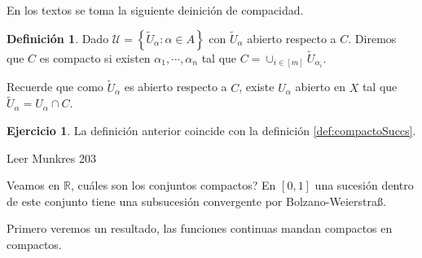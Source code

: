 \documentclass[12pt]{article}
\theoremstyle{plain}
\theoremstyle{definition}
\newtheorem{Def}[Th]{Definición}       %
\newtheorem{Ej}[Th]{Ejercicio}
\theoremstyle{remark}
\numberwithin{equation}{section}
\newcommand{\bR}{\mathbb{R}}        %
\newcommand{\cU}{\mathcal{U}}       %
\renewcommand{\:}{\colon}           %
\newcommand{\conj}[1]{\left\lbrace#1\right\rbrace}
\newcommand{\bonj}[1]{\left\lbrack#1\right\rbrack}
\begin{document}
\begin{multicols}{2}
En los textos se toma la siguiente deinición de compacidad.
\begin{Def}\label{def:compactoCubrimientos}
  Dado $\cU=\conj{\widetilde{U}_\alpha\colon \alpha\in A}$ con $\widetilde{U}_\alpha$ abierto respecto a $C$. Diremos que $C$ es compacto si existen $\alpha_1,\cdots,\alpha_n$ tal que $C=\cup_{i\in\bonj{m}}\widetilde{U}_{\alpha_i}$.
\end{Def}

Recuerde que como $\widetilde{U}_\alpha$ es abierto respecto a $C$, existe $U_\alpha$ abierto en $X$ tal que $\widetilde{U}_\alpha=U_\alpha\cap C$.
\begin{Ej}
  La definición anterior coincide con la definición \ref{def:compactoSuccs}.
\end{Ej}

\begin{ptcb}
Leer Munkres 203
\end{ptcb}
Veamos en $\bR$, cuáles son los conjuntos compactos? En $\bonj{0,1}$ una sucesión dentro de este conjunto tiene una subsucesión convergente por Bolzano-Weierstra{\ss}.\par
Primero veremos un resultado, las funciones continuas mandan compactos en compactos.


\end{multicols}
\end{document}
